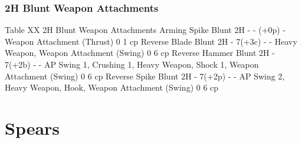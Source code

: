 \documentclass[oneside,11pt,english]{book}
\begin{document}
\subsubsection{2H Blunt Weapon Attachments} %
Table XX 2H Blunt Weapon Attachments
Arming Spike Blunt 2H - - (+0p) - Weapon Attachment (Thrust) 0 1 cp
Reverse Blade Blunt 2H - 7(+3c) - - Heavy Weapon, Weapon Attachment (Swing) 0 6 cp
Reverse Hammer Blunt 2H - 7(+2b) - - AP Swing 1, Crushing 1, Heavy Weapon, Shock 1, Weapon Attachment (Swing) 0 6 cp
Reverse Spike Blunt 2H - 7(+2p) - - AP Swing 2, Heavy Weapon, Hook, Weapon Attachment (Swing) 0 6 cp

\section{Spears}
\end{document}
